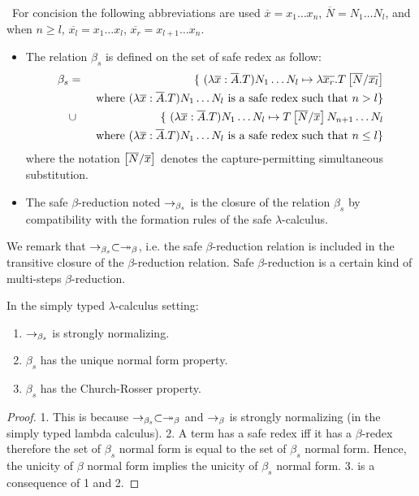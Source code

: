 \begin{dfn} \
For concision the following abbreviations are used $\overline{x} = x_1 \ldots
x_n$, $\overline{N} = N_1 \ldots N_l$, and when $n\geq l$, $\overline{x_l} = x_1 \ldots
x_l$, $\overline{x_r} = x_{l+1} \ldots x_n$.
\begin{itemize}
\item The relation $\beta_s$ is defined on the set of safe redex as follow:
\begin{eqnarray*}
\beta_s &=&
\{  \ (\lambda \overline{x} : \overline{A} . T) N_1 \ldots N_l \mapsto \lambda \overline{x_r}. T\left[ \overline{N}/\overline{x_l} \right]  \\
&& \mbox{ where $(\lambda \overline{x} : \overline{A} . T) N_1 \ldots N_l$ is a safe redex such that $n> l$}
\} \\
&\cup&
\{ \ (\lambda \overline{x} : \overline{A} . T) N_1 \ldots N_l \mapsto T\left[ \overline{N}/\overline{x} \right] N_{n+1} \ldots N_l  \\
&& \mbox{ where $(\lambda \overline{x} : \overline{A} . T) N_1 \ldots N_l$ is a safe redex such that $n\leq l$}
\}
\end{eqnarray*}
where the notation $\left[ \overline{N}/\overline{x} \right]$ denotes the capture-permitting simultaneous substitution.

\item
The safe $\beta$-reduction noted $\rightarrow_{\beta_s}$ is the closure
of the relation $\beta_s$ by compatibility with the formation rules
of the safe $\lambda$-calculus.
\end{itemize}
\end{dfn}

We remark that $\rightarrow_{\beta_s} \subset \twoheadrightarrow_\beta$, i.e. the safe
$\beta$-reduction relation is included in the transitive closure of
the $\beta$-reduction relation. Safe $\beta$-reduction is a certain
kind of multi-steps $\beta$-reduction.

\begin{property} In the simply typed $\lambda$-calculus setting:
\begin{enumerate}
\item $\rightarrow_{\beta_s}$ is strongly normalizing.
\item $\beta_s$ has the unique normal form property.
\item $\beta_s$ has the Church-Rosser property.
\end{enumerate}
\end{property}

\begin{proof}
1. This is because $\rightarrow_{\beta_s} \subset \twoheadrightarrow_\beta$ and $\rightarrow_\beta$ is strongly normalizing (in the simply typed lambda calculus).
2. A term has a safe redex iff it has a $\beta$-redex therefore
the set of $\beta_s$ normal form is equal to the set of $\beta_s$
normal form. Hence, the unicity of $\beta$ normal form implies the
unicity of $\beta_s$ normal form.
3. is a consequence of 1 and 2.
\end{proof}


